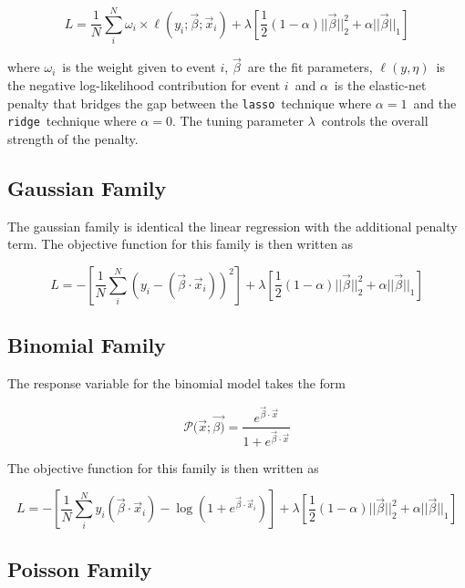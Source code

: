 \documentclass[11pt, oneside]{article}   	%
\newcommand{\vx}{\vec{x}}
\newcommand{\vxi}{\vec{x}_{i}}
\newcommand{\yi}{y_{i}}
\newcommand{\vb}{\vec{\beta}}
\newcommand{\px}{\mathcal{P}(\vec{x};\vec{\beta)}}
\begin{document}
\begin{equation}
L = \frac{1}{N} \sum_{i}^{N} \omega_{i} \times \ell(\yi; \vb ; \vxi) + \lambda \left[ \frac{1}{2}(1 - \alpha) || \vb ||_{2}^{2} + \alpha || \vb ||_{1} \right]
\end{equation}

where $\omega_{i}$~is the weight given to event $i$, $\vb$~are the fit parameters, $\ell(y,\eta)$~is the negative log-likelihood contribution for event $i$~and $\alpha$~is the elastic-net penalty that bridges the gap between the {\tt lasso}~technique where $\alpha=1$~and the {\tt ridge}~technique where $\alpha=0$. The tuning parameter $\lambda$~controls the overall strength of the penalty.

\subsection{Gaussian Family}

The gaussian family is identical the linear regression with the additional penalty term. The objective function for this family is then written as

\begin{equation}
L = - \left[ \frac{1}{N} \sum_{i}^{N} (\yi - (\vb \cdot \vxi))^{2}  \right] + \lambda \left[ \frac{1}{2}(1 - \alpha) || \vb ||_{2}^{2} + \alpha || \vb ||_{1} \right]
\end{equation}


\subsection{Binomial Family}

The response variable for the binomial model takes the form

\begin{equation}
\px = \frac{e^{\vb \cdot \vx}}{1 + e^{\vb \cdot \vx}}
\end{equation}

The objective function for this family is then written as

\begin{equation}
L = - \left[ \frac{1}{N} \sum_{i}^{N} \yi (\vb \cdot \vxi) - \log (1 + e^{\vb \cdot \vxi}) \right] + \lambda \left[ \frac{1}{2}(1 - \alpha) || \vb ||_{2}^{2} + \alpha || \vb ||_{1} \right]
\end{equation}

\subsection{Poisson Family}
\end{document}
